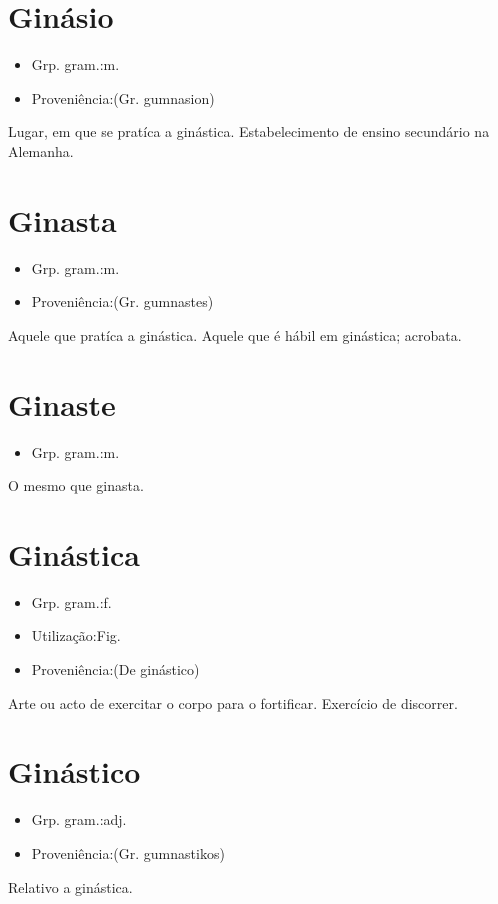 \section{Ginásio}
\begin{itemize}
\item {Grp. gram.:m.}
\end{itemize}
\begin{itemize}
\item {Proveniência:(Gr. \textunderscore gumnasion\textunderscore )}
\end{itemize}
Lugar, em que se pratíca a ginástica.
Estabelecimento de ensino secundário na Alemanha.
\section{Ginasta}
\begin{itemize}
\item {Grp. gram.:m.}
\end{itemize}
\begin{itemize}
\item {Proveniência:(Gr. \textunderscore gumnastes\textunderscore )}
\end{itemize}
Aquele que pratíca a ginástica.
Aquele que é hábil em ginástica; acrobata.
\section{Ginaste}
\begin{itemize}
\item {Grp. gram.:m.}
\end{itemize}
O mesmo que \textunderscore ginasta\textunderscore .
\section{Ginástica}
\begin{itemize}
\item {Grp. gram.:f.}
\end{itemize}
\begin{itemize}
\item {Utilização:Fig.}
\end{itemize}
\begin{itemize}
\item {Proveniência:(De \textunderscore ginástico\textunderscore )}
\end{itemize}
Arte ou acto de exercitar o corpo para o fortificar.
Exercício de discorrer.
\section{Ginástico}
\begin{itemize}
\item {Grp. gram.:adj.}
\end{itemize}
\begin{itemize}
\item {Proveniência:(Gr. \textunderscore gumnastikos\textunderscore )}
\end{itemize}
Relativo a ginástica.
